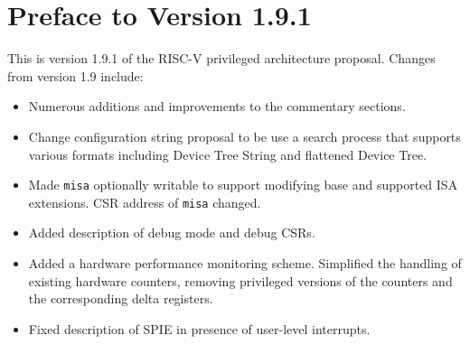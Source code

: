 \newpage

\section*{Preface to Version 1.9.1}

This is version 1.9.1 of the RISC-V privileged architecture
proposal.  Changes from version 1.9 include:

\begin{itemize}
  \parskip 0pt
  \itemsep 1pt
\item Numerous additions and improvements to the commentary sections.
\item Change configuration string proposal to be use a search process
  that supports various formats including Device Tree String and
  flattened Device Tree.
\item Made {\tt misa} optionally writable to support modifying base
  and supported ISA extensions.  CSR address of {\tt misa} changed.
\item Added description of debug mode and debug CSRs.
\item Added a hardware performance monitoring scheme.  Simplified the
  handling of existing hardware counters, removing privileged versions
  of the counters and the corresponding delta registers.
\item Fixed description of SPIE in presence of user-level interrupts.
\end{itemize}
